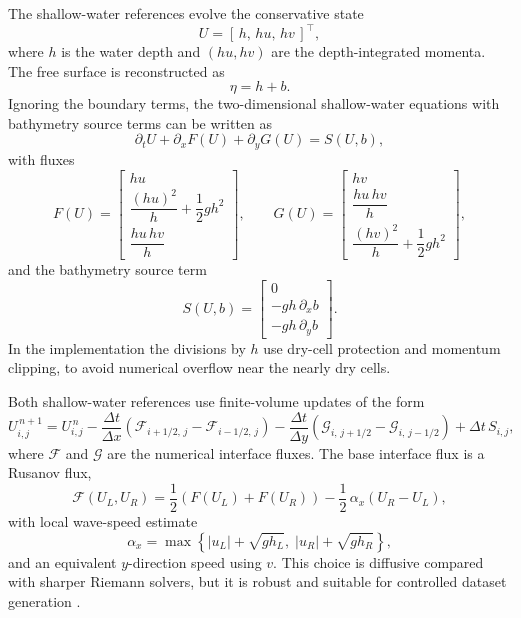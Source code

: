 The shallow-water references evolve the conservative state
\[
U = [\,h,\, hu,\, hv\,]^\top,
\]
where $h$ is the water depth and $(hu, hv)$ are the depth-integrated momenta. The free surface is reconstructed as
\[
\eta = h + b.
\]
Ignoring the boundary terms, the two-dimensional shallow-water equations with bathymetry source terms can be written as
\[
\partial_t U + \partial_x F(U) + \partial_y G(U) = S(U, b),
\]
with fluxes
\[
F(U) = 
\begin{bmatrix}
    hu \\[2pt]
    \dfrac{(hu) ^ 2}{h} + \dfrac{1}{2}gh ^ 2 \\[6pt]
    \dfrac{hu\, hv}{h}    
\end{bmatrix},
\qquad
G(U) =
\begin{bmatrix}
    hv \\[2pt]
    \dfrac{hu\, hv}{h} \\[6pt]
    \dfrac{(hv) ^ 2}{h} + \dfrac{1}{2}gh ^ 2
\end{bmatrix},
\]
and the bathymetry source term
\[
S(U, b) =
\begin{bmatrix}
    0 \\
    -gh\, \partial_x b \\
    -gh\, \partial_y b
\end{bmatrix}.
\]
In the implementation the divisions by $h$ use dry-cell protection and momentum clipping, to avoid numerical overflow near the nearly dry cells.

Both shallow-water references use finite-volume updates of the form
\[
U_{i, j} ^ {\,n + 1} = U_{i, j} ^ {\,n}
- \frac{\Delta t}{\Delta x} \left(\mathcal{F}_{i + 1/2,\, j} - \mathcal{F}_{i - 1/2,\, j}\right)
- \frac{\Delta t}{\Delta y} \left(\mathcal{G}_{i,\, j + 1/2} - \mathcal{G}_{i,\, j - 1/2}\right)
+ \Delta t\, S_{i, j},
\]
where $\mathcal{F}$ and $\mathcal{G}$ are the numerical interface fluxes. The base interface flux is a Rusanov flux,
\[
\mathcal{F}(U_L, U_R) = \frac{1}{2}\left(F(U_L) + F(U_R)\right) - \frac{1}{2}\,\alpha_x\left(U_R - U_L\right),
\]
with local wave-speed estimate
\[
\alpha_x = \max\!\left\{|u_L| + \sqrt{g h_L},\; |u_R| + \sqrt{g h_R}\right\},
\]
and an equivalent $y$-direction speed using $v$. This choice is diffusive compared with sharper Riemann solvers, but it is robust and suitable for controlled dataset generation \citep{toro2009riemann,toro2026rusanov}.


